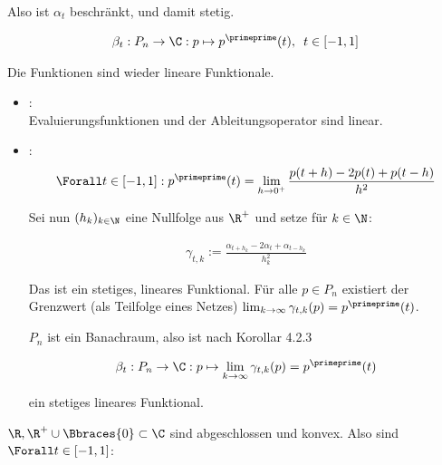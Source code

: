 \begin{solution}
\begin{itemize}
  Also ist $\alpha_t$ beschränkt, und damit stetig.

\end{itemize}

\begin{align*}
  \beta_t :
  P_n \to \C:
  p \mapsto p^\primeprime(t),
  \enspace
  t \in [-1, 1]
\end{align*}

Die Funktionen sind wieder lineare Funktionale.

\begin{itemize}

  \item
  : \\

  Evaluierungsfunktionen und der Ableitungsoperator sind linear.

  \item
  : \\

  \begin{align*}
    \Forall t \in [-1, 1]:
    p^\primeprime(t)
    =
    \lim_{h \to 0^+} \frac{p(t+h) - 2 p(t) + p(t-h)}{h^2}
  \end{align*}

  Sei nun $(h_k)_{k \in \N}$ eine Nullfolge aus $\R^+$ und setze für $k \in \N$:

  \begin{align*}
    \gamma_{t, k}
    :=
    \frac
    {
      \alpha_{t + h_k} -
      2 \alpha_t +
      \alpha_{t - h_k}
    }
    {h_k^2}
  \end{align*}

  Das ist ein stetiges, lineares Funktional.
  Für alle $p \in P_n$ existiert der Grenzwert (als Teilfolge eines Netzes) $\lim_{k \to \infty} \gamma_{t, k}(p) = p^\primeprime(t)$.


  $P_n$ ist ein Banachraum, also ist nach Korollar 4.2.3

  \begin{align*}
    \beta_t:
    P_n \to \C:
    p \mapsto \lim_{k \to \infty} \gamma_{t, k}(p) = p^\primeprime(t)
  \end{align*}

  ein stetiges lineares Funktional.

\end{itemize}

$\R, \R^+ \cup \Bbraces{0} \subset \C$ sind abgeschlossen und konvex.
Also sind $\Forall t \in [-1, 1]$:


\end{solution}
